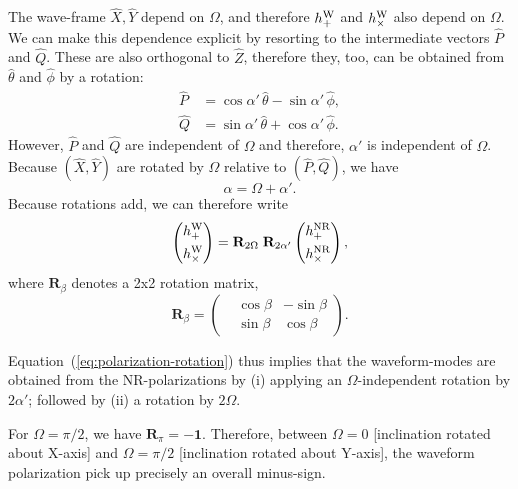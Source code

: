 \documentclass[11pt,tightenlines,article,amssymb,amsmath,amsfonts,superscriptaddress]{revtex4}
\newcommand{\EtNR}{{\hat\theta}}
\newcommand{\EpNR}{{\hat\phi}}
\newcommand{\hpNR}{h_+^{\rm NR}}
\newcommand{\hcNR}{h_{\times}^{\rm NR}}
\newcommand{\ExW}{\hat X}
\newcommand{\EyW}{\hat Y}
\newcommand{\EzW}{\hat Z}
\newcommand{\hpW}{h_+^{\rm W}}
\newcommand{\hcW}{h_\times^{\rm W}}
\begin{document}
The wave-frame $\ExW, \EyW$ depend on $\Omega$, and therefore $\hpW$
and $\hcW$ also depend on $\Omega$.  We can make this dependence
explicit by resorting to the intermediate vectors $\hat P$ and
$\hat Q$.  These are also orthogonal to $\EzW$, therefore they, too,
can be obtained from $\EtNR$ and $\EpNR$ by a rotation:
\begin{subequations}
\begin{align}
\hat P & = \cos\alpha'\,\EtNR - \sin\alpha'\,\EpNR,\\
\hat Q & = \sin\alpha'\,\EtNR + \cos\alpha'\,\EpNR.
\end{align}
\end{subequations}
However, $\hat P$ and $\hat Q$ are independent of $\Omega$ and
therefore, $\alpha'$ is independent of $\Omega$.  Because
$(\ExW, \EyW)$ are rotated by $\Omega$ relative to $(\hat P, \hat Q)$,
we have
\begin{equation}
\alpha = \Omega+\alpha'.
\end{equation}
Because rotations add, we can therefore write
\begin{equation}\label{eq:polarization-rotation}
\left(\begin{aligned}\hpW\\\hcW \end{aligned}\right)
= {\mathbf R}_{2\Omega}\; {\mathbf R}_{2\alpha'} 
\left(\begin{aligned}\hpNR\\\hcNR \end{aligned}\right),
\end{equation}
where ${\mathbf R}_\beta$ denotes a 2x2 rotation matrix,
\begin{equation}
{\mathbf R}_\beta = \left(\begin{aligned}&\cos\beta & -\sin\beta \\ & \sin\beta & \cos\beta\end{aligned}\right).
\end{equation}

Equation~(\ref{eq:polarization-rotation}) thus implies that the
waveform-modes are obtained from the NR-polarizations by (i) applying
an $\Omega$-independent rotation by $2\alpha'$; followed by (ii) a
rotation by $2\Omega$.

For $\Omega=\pi/2$, we have ${\mathbf R}_\pi = -{\mathbf 1}$.
Therefore, between $\Omega=0$ [inclination rotated about X-axis] and
$\Omega=\pi/2$ [inclination rotated about Y-axis], the waveform
polarization pick up precisely an overall minus-sign. 
\end{document}
